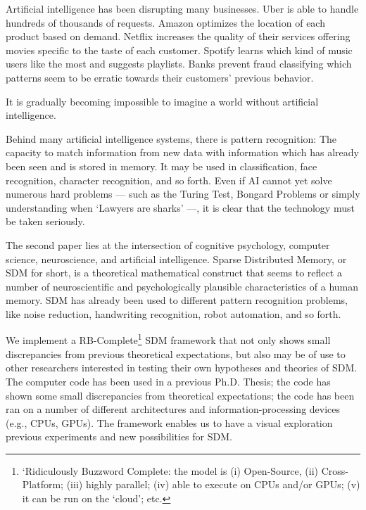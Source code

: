 Artificial intelligence has been disrupting many businesses. Uber is able to handle hundreds of thousands of requests. Amazon optimizes the location of each product based on demand. Netflix increases the quality of their services offering movies specific to the taste of each customer. Spotify learns which kind of music users like the most and suggests playlists. Banks prevent fraud classifying which patterns seem to be erratic towards their customers' previous behavior.

It is gradually becoming impossible to imagine a world without artificial intelligence.

Behind many artificial intelligence systems, there is pattern recognition: The capacity to match information from new data with information which has already been seen and is stored in memory. It may be used in classification, face recognition, character recognition, and so forth.  Even if AI cannot yet solve numerous hard problems --- such as the Turing Test, Bongard Problems or simply understanding when `Lawyers are sharks' \citep{french1990subcognition, french2000turing, linhares2000glimpse, french2001co} ---, it is clear that the technology must be taken seriously.

The second paper lies at the intersection of cognitive psychology, computer science, neuroscience, and artificial intelligence.  Sparse Distributed Memory, or SDM for short, is a theoretical mathematical construct that seems to reflect a number of neuroscientific and psychologically plausible characteristics of a human memory. SDM has already been used to different pattern recognition problems, like noise reduction, handwriting recognition, robot automation, and so forth.

We implement a RB-Complete\footnote{`Ridiculously Buzzword Complete: the model is (i) Open-Source, (ii) Cross-Platform; (iii) highly parallel; (iv) able to execute on CPUs and/or GPUs; (v) it can be run on the `cloud'; etc.} SDM framework that not only shows small discrepancies from previous theoretical expectations, but also may be of use to other researchers interested in testing their own hypotheses and theories of SDM. The computer code has been used in a previous Ph.D. Thesis; the code has shown some small discrepancies from theoretical expectations; the code has been ran on a number of different architectures and information-processing devices (e.g., CPUs, GPUs).  The framework enables us to have a visual exploration previous experiments and new possibilities for SDM.

